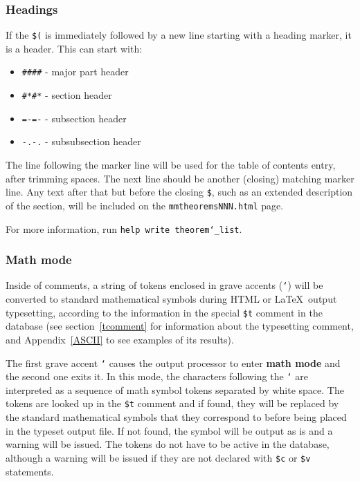 \subsubsection{Headings}\label{commentheadings}

If the \texttt{\$(} is immediately followed by a new line
starting with a heading marker, it is a header.
This can start with:

\begin{itemize}
 \item[] \texttt{\#\#\#\#} - major part header
 \item[] \texttt{\#*\#*} - section header
 \item[] \texttt{=-=-} - subsection header
 \item[] \texttt{-.-.} - subsubsection header
\end{itemize}

The line following the marker line
will be used for the table of contents entry, after trimming spaces.
The next line should be another (closing) matching marker line.
Any text after that
but before the closing \texttt{\$}, such as an extended description of the
section, will be included on the \texttt{mmtheoremsNNN.html} page.

For more information, run
\texttt{help write theorem\char`\_list}.

\subsubsection{Math mode}
\label{mathcomments}

Inside of comments, a string of tokens enclosed in
grave accents (\texttt{`}) will be converted
to standard mathematical symbols during
{\sc HTML} or \LaTeX\ output
typesetting, according to the information in the
special \texttt{\$t} comment in the database
(see section~\ref{tcomment} for information about the typesetting
comment, and Appendix~\ref{ASCII} to see examples of its results).

The first grave accent \texttt{`}
causes the output processor to enter {\bf math mode}
and the second one exits it.
In this
mode, the characters following the \texttt{`} are interpreted as a
sequence of math symbol tokens separated by white space.  The tokens are looked up in the \texttt{\$t}
comment and if
found, they will be replaced by the standard mathematical symbols that
they correspond to before being placed in the typeset output file.  If
not found, the symbol will be output as is and a warning will be issued.
The tokens do not have to be active in the database, although a warning
will be issued if they are not declared with \texttt{\$c} or
\texttt{\$v} statements.

